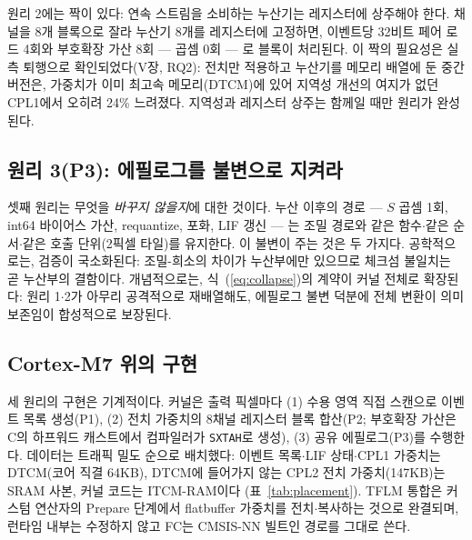 원리 2에는 짝이 있다: 연속 스트림을 소비하는 누산기는 레지스터에
상주해야 한다. 채널을 8개 블록으로 잘라 누산기 8개를 레지스터에
고정하면, 이벤트당 32비트 페어 로드 4회와 부호확장 가산 8회 ---
곱셈 0회 --- 로 블록이 처리된다. 이 짝의 필요성은 실측 퇴행으로
확인되었다(V장, RQ2): 전치만 적용하고 누산기를 메모리
배열에 둔 중간 버전은, 가중치가 이미 최고속 메모리(DTCM)에 있어
지역성 개선의 여지가 없던 CPL1에서 오히려 24\% 느려졌다. 지역성과
레지스터 상주는 함께일 때만 원리가 완성된다.

\subsection{원리 3(P3): 에필로그를 불변으로 지켜라}\label{sec:p3}

셋째 원리는 무엇을 \emph{바꾸지 않을지}에 대한 것이다. 누산 이후의
경로 --- $S$ 곱셈 1회, int64 바이어스 가산, requantize, 포화, LIF
갱신 --- 는 조밀 경로와 같은 함수$\cdot$같은 순서$\cdot$같은 호출
단위(2픽셀 타일)를 유지한다. 이 불변이 주는 것은 두 가지다.
공학적으로는, 검증이 국소화된다: 조밀-희소의 차이가 누산부에만
있으므로 체크섬 불일치는 곧 누산부의 결함이다. 개념적으로는,
식~(\ref{eq:collapse})의 계약이 커널 전체로 확장된다: 원리 1$\cdot$2가
아무리 공격적으로 재배열해도, 에필로그 불변 덕분에 전체 변환이 의미
보존임이 합성적으로 보장된다.

\subsection{Cortex-M7 위의 구현}\label{sec:impl}

세 원리의 구현은 기계적이다. 커널은 출력 픽셀마다 (1) 수용 영역
직접 스캔으로 이벤트 목록 생성(P1), (2) 전치 가중치의 8채널
레지스터 블록 합산(P2; 부호확장 가산은 C의 하프워드 캐스트에서
컴파일러가 \texttt{SXTAH}로 생성), (3) 공유 에필로그(P3)를 수행한다.
데이터는 트래픽 밀도 순으로 배치했다: 이벤트 목록$\cdot$LIF
상태$\cdot$CPL1 가중치는 DTCM(코어 직결 64KB), DTCM에 들어가지 않는
CPL2 전치 가중치(147KB)는 SRAM 사본, 커널 코드는 ITCM-RAM이다
(표~\ref{tab:placement}). TFLM 통합은 커스텀 연산자의 Prepare
단계에서 flatbuffer 가중치를 전치$\cdot$복사하는 것으로 완결되며,
런타임 내부는 수정하지 않고 FC는 CMSIS-NN 빌트인 경로를 그대로
쓴다.


